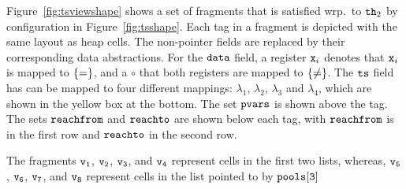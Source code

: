 
Figure~\ref{fig:tsviewshape} shows a set of fragments that is
satisfied wrp.\ to ${\tt th}_2$ by configuration in Figure~\ref{fig:tsshape}.
Each tag in a fragment is depicted with the same layout as heap cells.
The non-pointer fields are replaced by their corresponding data abstractions. 
For the $\tt data$ field, a register $\mathtt{x}_i$ denotes that $\mathtt{x}_i$ is mapped to
$\left\{=\right\}$, and a $\circ$ that both registers are mapped to $\left\{\neq\right\}$.
The ${\tt ts}$ field has can be mapped to four different mappings: $\lambda_1$, $\lambda_2$, $\lambda_3$ and $\lambda_4$, which are shown in the
yellow box at the bottom.
The set $\mathtt{pvars}$ is shown above the tag.
The sets $\mathtt{reachfrom}$ and $\mathtt{reachto}$ are shown below each tag, with
$\mathtt{reachfrom}$ is in the first row and $\mathtt{reachto}$ in the second row.

The fragments $\tt v_1$, $\tt v_2$, $\tt v_3$, and $\tt v_4$ represent cells
in the first two lists, whereas, $\tt v_5$, $\tt v_6$, $\tt v_7$, and $\tt v_8$
represent cells in the list pointed to by $\tt pools[3]$




